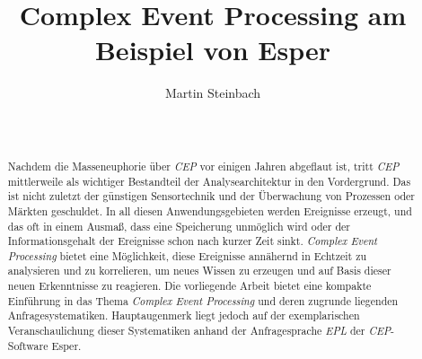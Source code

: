 \documentclass{acm_proc_article-sp}
\begin{document}
\title{Complex Event Processing am Beispiel von Esper}
\author{
\alignauthor
Martin Steinbach\vspace{0.1cm}\\
       \\
       \\
       }




\maketitle

\begin{abstract}
\vspace{0.1cm}
Nachdem die Masseneuphorie über \textit{CEP} vor einigen Jahren abgeflaut ist, tritt 
\textit{CEP} mittlerweile als wichtiger Bestandteil der Analysearchitektur in den 
Vordergrund. Das ist nicht 
zuletzt der günstigen Sensortechnik und der Überwachung von Prozessen oder Märkten 
geschuldet. In all diesen Anwendungsgebieten werden Ereignisse erzeugt, und das oft in 
einem Ausmaß, dass eine Speicherung unmöglich wird oder der Informationsgehalt der 
Ereignisse schon nach kurzer Zeit sinkt. \textit{Complex Event Processing} bietet eine 
Möglichkeit, diese Ereignisse annähernd in Echtzeit zu analysieren und zu korrelieren, um 
neues Wissen zu erzeugen und auf Basis dieser neuen Erkenntnisse zu reagieren. Die 
vorliegende Arbeit bietet eine kompakte Einführung in das Thema \textit{Complex Event 
Processing} und deren zugrunde liegenden Anfragesystematiken. Hauptaugenmerk liegt jedoch 
auf der exemplarischen Veranschaulichung dieser Systematiken anhand der Anfragesprache 
\textit{EPL} der \textit{CEP}-Software Esper.

\end{abstract}


\end{document}
